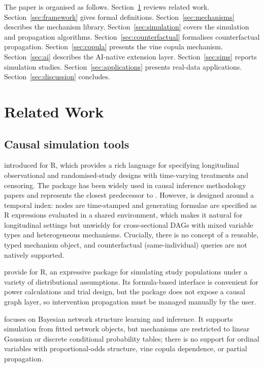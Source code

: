 \documentclass[article]{jss}
\begin{document}
The paper is organised as follows. Section~\ref{sec:related} reviews related work. Section~\ref{sec:framework} gives formal definitions. Section~\ref{sec:mechanisms} describes the mechanism library. Section~\ref{sec:simulation} covers the simulation and propagation algorithms. Section~\ref{sec:counterfactual} formalises counterfactual propagation. Section~\ref{sec:copula} presents the vine copula mechanism. Section~\ref{sec:ai} describes the AI-native extension layer. Section~\ref{sec:sims} reports simulation studies. Section~\ref{sec:applications} presents real-data applications. Section~\ref{sec:discussion} concludes.

\section{Related Work}
\label{sec:related}

\subsection{Causal simulation tools}

\citet{sofrygin2017simcausal} introduced  for R, which provides a rich language for specifying longitudinal observational and randomised-study designs with time-varying treatments and censoring. The package has been widely used in causal inference methodology papers \citep{luedtke2016, laan2018} and represents the closest predecessor to . However,  is designed around a temporal index: nodes are time-stamped and generating formulae are specified as R expressions evaluated in a shared environment, which makes it natural for longitudinal settings but unwieldy for cross-sectional DAGs with mixed variable types and heterogeneous mechanisms. Crucially, there is no concept of a reusable, typed mechanism object, and counterfactual (same-individual) queries are not natively supported.

\citet{goldfeld2020simstudy} provide  for R, an expressive package for simulating study populations under a variety of distributional assumptions. Its formula-based interface is convenient for power calculations and trial design, but the package does not expose a causal graph layer, so intervention propagation must be managed manually by the user.

 \citep{scutari2010bnlearn} focuses on Bayesian network structure learning and inference. It supports simulation from fitted network objects, but mechanisms are restricted to linear Gaussian or discrete conditional probability tables; there is no support for ordinal variables with proportional-odds structure, vine copula dependence, or partial propagation.
\end{document}
